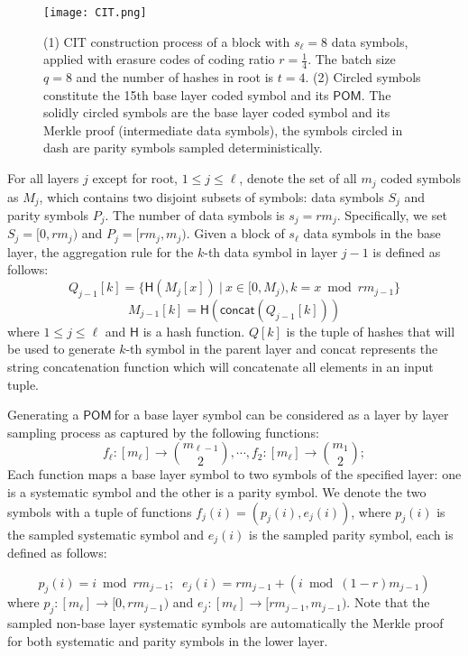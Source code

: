 \documentclass{article}
\newcommand{\POM}{$\mathsf{POM}\ $}
\newcommand{\h}{\textsf{H}}
\begin{document}
\begin{figure}[hbt]
    \centering
    \texttt{[image: CIT.png]}
    \caption{(1) CIT construction process of a block with $s_{\ell} = 8$ data symbols, applied with erasure codes of coding ratio $r = \frac{1}{4}$. The batch size $q = 8$ and the number of hashes in root is $t=4$. (2) Circled symbols constitute the 15th base layer coded symbol and its $\mathsf{POM}$. The solidly circled symbols are the base layer coded symbol and its Merkle proof (intermediate data symbols), the symbols circled in dash are parity symbols sampled deterministically.}
    \label{fig:tree}
\end{figure}

For all layers $j$ except for root, $1\le j \le \ell$, denote the set of all $m_j$ coded symbols as $M_j$, which contains two disjoint subsets of symbols: data symbols $S_j$ and parity symbols $P_j$. The number of data symbols is $s_j = r m_j$. Specifically, we set $S_j = [0, rm_j)$ and $P_j=[rm_j, m_j)$. Given a block of $s_{\ell}$ data symbols in the base layer, the aggregation rule for the $k$-th data symbol in layer $j-1$ is defined as follows:
\begin{equation}
  Q_{j-1}[k] = \{ \h(M_{j}[x])\ |\ x \in [0,M_{j}), k = x \bmod rm_{j-1} \} 
\end{equation}
\begin{equation}
M_{j-1}[k] = \h(\mathsf{concat}(Q_{j-1}[k]))
\end{equation}
where $1\le j \le \ell$ and $\h$ is a hash function. $Q[k]$ is the tuple of hashes that will be used to generate $k$-th symbol in the parent layer and \textsf{concat} represents the string concatenation function which will concatenate all elements in an input tuple.

Generating a \POM for a base layer symbol can be considered as a layer by layer sampling process as captured by the following functions:
\begin{equation*}
	f_{\ell}: [m_{\ell}] \to {m_{\ell-1} \choose 2}, \cdots,  f_{2}: [m_{\ell}] \to {m_{1} \choose 2};
\end{equation*}
Each function maps a base layer symbol to two symbols of the specified layer: one is a systematic symbol and the other is a parity symbol. 
We denote the two symbols with a tuple of functions $f_j(i) = (p_j(i), e_j(i))$, where $p_j(i)$ is the sampled systematic symbol and $e_j(i)$ is the sampled parity symbol, each is defined as follows:

\begin{equation}
\label{eq:pe}
    p_{j}(i) = i \bmod rm_{j-1}  ; \;\; e_{j}(i) = rm_{j-1}  + (i \bmod (1-r) m_{j-1})
\end{equation}
where $p_{j}: [m_{\ell}] \to [0, rm_{j-1})$ and $e_{j}: [m_{\ell}] \to [rm_{j-1}, m_{j-1})$. Note that the sampled non-base layer systematic symbols are automatically the Merkle proof for both systematic and parity symbols in the lower layer.
\end{document}
